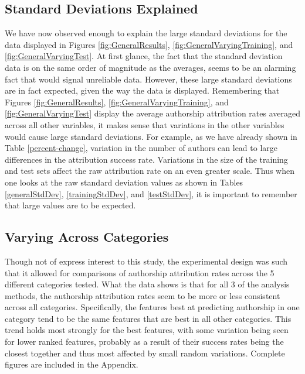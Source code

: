 \documentclass[pageno]{jpaper}
\begin{document}
\subsection{Standard Deviations Explained}
\label{sec:explainingStdDev}
We have now observed enough to explain the large standard deviations for the data displayed in Figures \ref{fig:GeneralResults}, \ref{fig:GeneralVaryingTraining}, and \ref{fig:GeneralVaryingTest}.  At first glance, the fact that the standard deviation data is on the same order of magnitude as the averages, seems to be an alarming fact that would signal unreliable data.  However, these large standard deviations are in fact expected, given the way the data is displayed.  Remembering that Figures \ref{fig:GeneralResults}, \ref{fig:GeneralVaryingTraining}, and \ref{fig:GeneralVaryingTest} display the average authorship attribution rates averaged across all other variables, it makes sense that variations in the other variables would cause large standard deviations.  For example, as we have already shown in Table \ref{percent-change}, variation in the number of authors can lead to large differences in the attribution success rate.  Variations in the size of the training and test sets affect the raw attribution rate on an even greater scale.  Thus when one looks at the raw standard deviation values as shown in Tables \ref{generalStdDev}, \ref{trainingStdDev}, and \ref{testStdDev}, it is important to remember that large values are to be expected.

\subsection{Varying Across Categories}
\label{sec:categories}
Though not of express interest to this study, the experimental design was such that it allowed for comparisons of authorship attribution rates across the 5 different categories tested.  What the data shows is that for all 3 of the analysis methods, the authorship attribution rates seem to be more or less consistent across all categories.  Specifically, the features best at predicting authorship in one category tend to be the same features that are best in all other categories.  This trend holds most strongly for the best features, with some variation being seen for lower ranked features, probably as a result of their success rates being the closest together and thus most affected by small random variations.  Complete figures are included in the Appendix.
\end{document}

